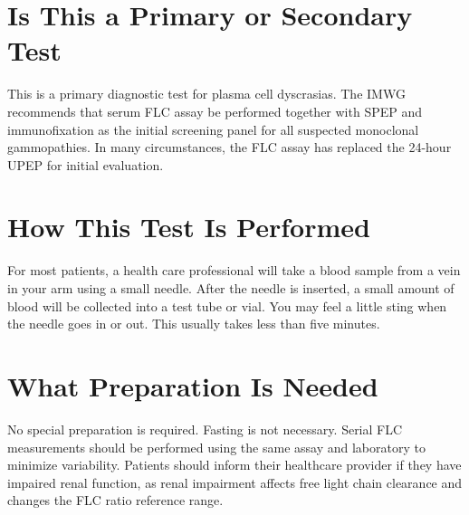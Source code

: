 \section*{Is This a Primary or Secondary Test}
This is a primary diagnostic test for plasma cell dyscrasias. The IMWG recommends that serum FLC assay be performed together with SPEP and immunofixation as the initial screening panel for all suspected monoclonal gammopathies. In many circumstances, the FLC assay has replaced the 24-hour UPEP for initial evaluation.

\section*{How This Test Is Performed}
For most patients, a health care professional will take a blood sample from a vein in your arm using a small needle. After the needle is inserted, a small amount of blood will be collected into a test tube or vial. You may feel a little sting when the needle goes in or out. This usually takes less than five minutes.

\section*{What Preparation Is Needed}
No special preparation is required. Fasting is not necessary. Serial FLC measurements should be performed using the same assay and laboratory to minimize variability. Patients should inform their healthcare provider if they have impaired renal function, as renal impairment affects free light chain clearance and changes the FLC ratio reference range.

